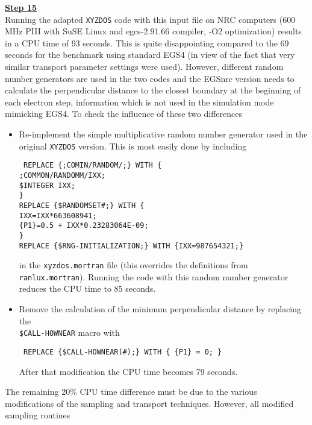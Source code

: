 \noindent
\underline{\bf Step 15} \hfill \\
Running the adapted {\tt XYZDOS} code with this input file on NRC computers
(600 MHz PIII with SuSE Linux and egcs-2.91.66 compiler, -O2 optimization)
results in a CPU time of 93 seconds. This is quite
disappointing compared to the
69 seconds for the benchmark using standard EGS4
(in view of the fact that very similar
transport parameter settings were used). However,
different random number generators are used in the two codes
and the EGSnrc version needs to calculate the perpendicular
distance to the closest boundary at the beginning of each electron step,
information which is not used in the simulation mode mimicking
EGS4. To check the influence of these two differences
\begin{itemize}
\item
Re-implement the simple multiplicative random number generator
used in the original {\tt XYZDOS} version. This is most easily
done by including
\begin{flushleft}{\tt
REPLACE \{;COMIN/RANDOM/;\} WITH \{ \\
\quad ;COMMON/RANDOMM/IXX; \\
\quad \$INTEGER IXX; \\
\} \\
REPLACE \{\$RANDOMSET\#;\} WITH \{ \\
\quad IXX=IXX*663608941; \\
\quad \{P1\}=0.5 + IXX*0.23283064E-09; \\
\} \\
REPLACE \{\$RNG-INITIALIZATION;\} WITH \{IXX=987654321;\} }
\end{flushleft}
in the {\tt xyzdos.mortran} file (this overrides the
definitions from {\tt ranlux.mortran}). Running the code
with this random number generator reduces the CPU time to
85 seconds.

\item
Remove the calculation of the minimum perpendicular
distance by replacing the \\{\tt \$CALL-HOWNEAR} macro with
\begin{flushleft}{\tt
REPLACE \{\$CALL-HOWNEAR(\#);\} WITH \{ \{P1\} = 0; \} }
\end{flushleft}
After that modification the CPU time becomes 79 seconds.
\end{itemize}
The remaining 20\% CPU time difference must be due to
the various  modifications of the sampling and transport
techniques. However, all modified sampling routines
